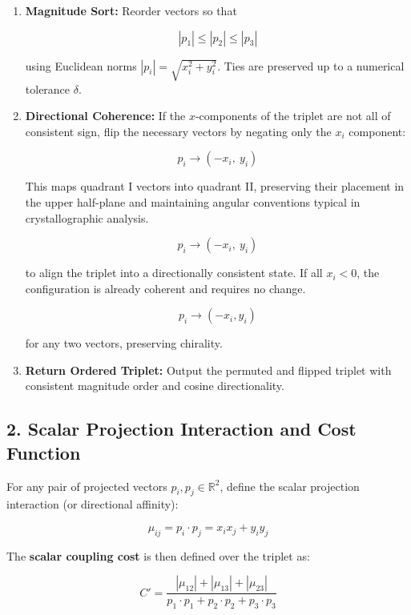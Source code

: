 \documentclass[preprint]{iucr}              %
\numberwithin{equation}{section}
\begin{document}
	\begin{enumerate}
		\item \textbf{Magnitude Sort:} Reorder vectors so that
		
		
		\[
		|p_1| \leq |p_2| \leq |p_3|
		\]
		
		
		using Euclidean norms \( |p_i| = \sqrt{x_i^2 + y_i^2} \). Ties are preserved up to a numerical tolerance \( \delta \).
		
\item \textbf{Directional Coherence:} If the \( x \)-components of the triplet are not all of consistent sign, flip the necessary vectors by negating only the \( x_i \) component:


\[
p_i \to (-x_i,\ y_i)
\]


This maps quadrant I vectors into quadrant II, preserving their placement in the upper half-plane and maintaining angular conventions typical in crystallographic analysis.



\[
p_i \to (-x_i,\ y_i)
\]


to align the triplet into a directionally consistent state. If all \( x_i < 0 \), the configuration is already coherent and requires no change.

		
		
		\[
		p_i \to (-x_i, y_i)
		\]
		
		
		for any two vectors, preserving chirality.
		
		\item \textbf{Return Ordered Triplet:} Output the permuted and flipped triplet with consistent magnitude order and cosine directionality.
	\end{enumerate}
	
	\vspace{1em}
	
	\subsection{2. Scalar Projection Interaction and Cost Function}
	
	For any pair of projected vectors \( p_i, p_j \in \mathbb{R}^2 \), define the scalar projection interaction (or directional affinity):
	
	
	\[
	\mu_{ij} = p_i \cdot p_j = x_i x_j + y_i y_j
	\]
	
	
	
	The \textbf{scalar coupling cost} is then defined over the triplet as:
	
	
	\[
	C' = \frac{|\mu_{12}| + |\mu_{13}| + |\mu_{23}|}{p_1 \cdot p_1 + p_2 \cdot p_2 + p_3 \cdot p_3}
	\]
	
\end{document}
